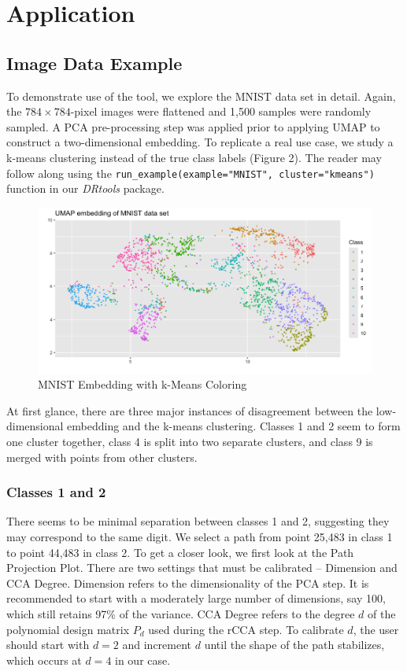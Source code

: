 \documentclass{article}
\begin{document}
{\section{Application}

\subsection{Image Data Example}
To demonstrate use of the tool, we explore the MNIST data set in detail. Again, the $784 \times 784$-pixel images were flattened and 1,500 samples were randomly sampled. A PCA pre-processing step was applied prior to applying UMAP \cite{UMAP} to construct a two-dimensional embedding. To replicate a real use case, we study a k-means clustering instead of the true class labels (Figure 2). The reader may follow along using the \texttt{run\_example(example="MNIST", cluster="kmeans")} function in our \textit{DRtools} package.

\renewcommand{\figurename}{Figure}
\renewcommand{\thefigure}{2}
\begin{figure}[!t]
\centering
\includegraphics[scale=0.43]{MNIST kmeans}
\caption{MNIST Embedding with k-Means Coloring}
\end{figure}

At first glance, there are three major instances of disagreement between the low-dimensional embedding and the k-means clustering. Classes 1 and 2 seem to form one cluster together, class 4 is split into two separate clusters, and class 9 is merged with points from other clusters.

\subsubsection{Classes 1 and 2}
There seems to be minimal separation between classes 1 and 2, suggesting they may correspond to the same digit. We select a path from point 25,483 in class 1 to point 44,483 in class 2. To get a closer look, we first look at the Path Projection Plot. There are two settings that must be calibrated -- Dimension and CCA Degree. Dimension refers to the dimensionality of the PCA step. It is recommended to start with a moderately large number of dimensions, say 100, which still retains 97\% of the variance. CCA Degree refers to the degree $d$ of the polynomial design matrix $P_d$ used during the rCCA step. To calibrate $d$, the user should start with $d = 2$ and increment $d$ until the shape of the path stabilizes, which occurs at $d = 4$ in our case.

}
\end{document}
